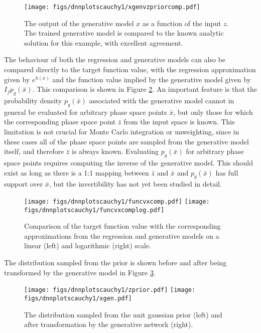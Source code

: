 \documentclass[a4paper,11pt]{article}
\begin{document}
\begin{figure}[htb!]
\begin{center}
\texttt{[image: figs/dnnplotscauchy1/xgenvzpriorcomp.pdf]}
\end{center}
\caption{The output of the generative model $x$ as a function of the input $z$.  The trained generative model is compared to the known analytic solution for this example, with excellent agreement.}
 \label{fig:cauchygen}
\end{figure}

The behaviour of both the regression and generative models can also be compared directly to the target function value, with the regression approximation given by $e^{h(\bar x)}$ and the function value implied by the generative model given by $I_f p_g(\bar x)$.  This comparison is shown in Figure \ref{fig:cauchyreg}.  An important feature is that the probability density $p_g(\bar x)$ associated with the generative model cannot in general be evaluated for arbitrary phase space points $\bar x$, but only those for which the corresponding phase space point $\bar z$ from the input space is known.  This limitation is not crucial for Monte Carlo integration or unweighting, since in these cases all of the phase space points are sampled from the generative model itself, and therefore $\bar z$ is always known.  Evaluating $p_g(\bar x)$ for arbitrary phase space points requires computing the inverse of the generative model.  This should exist as long as there is a 1:1 mapping between $\bar z$ and $\bar x$ and $p_g(\bar x)$ has full support over $\bar x$, but the invertibility has not yet been studied in detail.

\begin{figure}[htb!]
 \texttt{[image: figs/dnnplotscauchy1/funcvxcomp.pdf]}
 \texttt{[image: figs/dnnplotscauchy1/funcvxcomplog.pdf]}
 \caption{Comparison of the target function value with the corresponding approximations from the regression and generative models on a linear (left) and logarithmic (right) scale.}
 \label{fig:cauchyreg}
\end{figure}


The distribution sampled from the prior is shown before and after being transformed by the generative model in Figure \ref{fig:cauchygend}.
\begin{figure}[htb!]
 \texttt{[image: figs/dnnplotscauchy1/zprior.pdf]}
 \texttt{[image: figs/dnnplotscauchy1/xgen.pdf]}
 \caption{The distribution sampled from the unit gaussian prior (left) and after transformation by the generative network (right).}
 \label{fig:cauchygend}
\end{figure}
\end{document}
